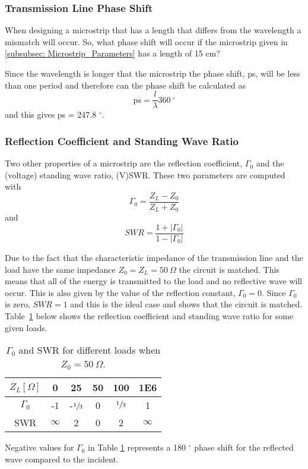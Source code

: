 \documentclass[report.tex]{subfiles}
\begin{document}
\subsubsection{Transmission Line Phase Shift}\label{subsubsec: Lab1 Phase Shift}
When designing a microstrip that has a length that differs from the wavelength a mismatch will occur. So, what phase shift will occur if the microstrip given in \ref{subsubsec: Microstrip_Parameters} has a length of 15 cm?

Since the wavelength is longer that the microstrip the phase shift, ps, will be less than one period and therefore can the phase shift be calculated as
\begin{equation}
	\text{ps} = \dfrac{l}{\lambda} 360 \:^\circ
\end{equation}
and this gives ps = 247.8 $^\circ$.
\subsubsection{Reflection Coefficient and Standing Wave Ratio}\label{subsec:Lab1 RC and SWR}
Two other properties of a microstrip are the reflection coefficient, $\Gamma_0$ and the (voltage) standing wave ratio, (V)SWR. These two parameters are computed with
\begin{equation}
	\Gamma_0 = \dfrac{Z_L - Z_0}{Z_L + Z_0}
\end{equation}
and
\begin{equation}\label{Lab1 eq: RC}
	SWR = \dfrac{1 + \left|\Gamma_0\right|}{1 - \left|\Gamma_0\right|}
\end{equation}

Due to the fact that the characteristic impedance of the transmission line and the load have the same impedance $Z_0 = Z_L = 50\:\Omega$ the circuit is matched. This means that all of the energy is transmitted to the load and no reflective wave will occur. This is also given by the value of the reflection constant, $\Gamma_0 = 0$. Since $\Gamma_0$ is zero, $SWR = 1$ and this is the ideal case and shows that the circuit is matched. Table~\ref{table: RC and SWR} below shows the reflection coefficient and standing wave ratio for some given loads.

\begin{table}[h]
    \centering
    \caption{$\Gamma_0$ and SWR for different loads when $Z_0= 50\: \Omega$.}
    \begin{tabular}{c | c c c c c}
         $Z_L [\Omega]$ & 0 & 25 & 50 & 100 & 1E6 \\
         \hline
         $\Gamma_0$ & -1 & -$\sfrac{1}{3}$ & 0 & $\sfrac{1}{3}$ & 1 \\
         SWR & $\infty$ & 2 & 0 & 2 & $\infty$
    \end{tabular}\label{table: RC and SWR}
\end{table}

Negative values for $\Gamma_0$ in Table \ref{table: RC and SWR} represents a 180 $^\circ$ phase shift for the reflected wave compared to the incident.
\end{document}
